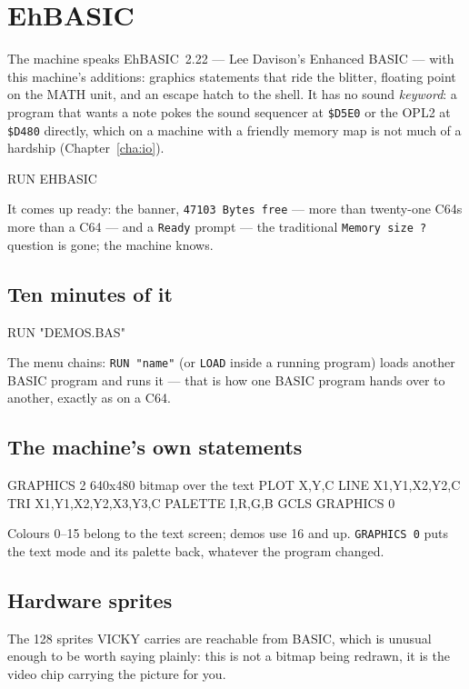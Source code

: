 \chapter{EhBASIC}\label{cha:basic}

The machine speaks EhBASIC~2.22 --- Lee Davison's Enhanced BASIC --- with
this machine's additions: graphics statements that ride the blitter,
floating point on the MATH unit, and an escape hatch to the shell. It has
no sound \emph{keyword}: a program that wants a note poke\-s the sound
sequencer at \texttt{\$D5E0} or the OPL2 at \texttt{\$D480} directly,
which on a machine with a friendly memory map is not much of a hardship
(Chapter~\ref{cha:io}).

\begin{type}
RUN EHBASIC
\end{type}

It comes up ready: the banner, \texttt{47103 Bytes free} --- more than
twenty-one C64s more than a C64 --- and a
\verb|Ready| prompt --- the traditional \texttt{Memory size ?} question is
gone; the machine knows.

\section{Ten minutes of it}
\begin{type}
RUN "DEMOS.BAS"
\end{type}


The menu chains: \verb|RUN "name"| (or \verb|LOAD| inside a running
program) loads another BASIC program and runs it --- that is how one BASIC
program hands over to another, exactly as on a C64.

\section{The machine's own statements}
\begin{type}
GRAPHICS 2          640x480 bitmap over the text
PLOT X,Y,C          LINE X1,Y1,X2,Y2,C
TRI X1,Y1,X2,Y2,X3,Y3,C
PALETTE I,R,G,B     GCLS            GRAPHICS 0
\end{type}

Colours 0--15 belong to the text screen; demos use 16 and up. \verb|GRAPHICS 0|
puts the text mode and its palette back, whatever the program changed.

\section{Hardware sprites}
The 128 sprites VICKY carries are reachable from BASIC, which is unusual
enough to be worth saying plainly: this is not a bitmap being redrawn, it
is the video chip carrying the picture for you.

